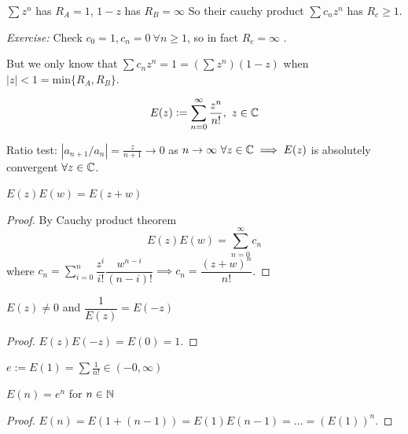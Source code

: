\documentclass[10pt,twoside]{scrartcl}
\begin{document}
\begin{example}
$\sum z^n$ has $R_A = 1$, $1-z$ has $R_B = \infty$ So their cauchy product $\sum c_nz^n$ has $R_c \geq 1$. 

\emph{Exercise:} Check $c_0 = 1, c_n = 0~\forall n \geq 1$, so in fact $R_c = \infty$	.

But we only know that $\sum c_n z^n = 1 = (\sum z^n)(1-z)$ when $|z| < 1 = \mathrm{min}\{R_A,R_B\}$. 
\end{example}

\vspace*{5pt}

\begin{definition}
\[E(z):= \sum_{n=0}^\infty \frac{z^n}{n!},~z\in\mathbb{C}\]

Ratio test: $|a_{n+1}/a_n| = \frac{z}{n+1} \to 0$ as $n \to \infty ~\forall z \in\mathbb{C}\implies E(z)$ is absolutely convergent $\forall z\in\mathbb{C}$.  
\end{definition}\vspace*{5pt}

\begin{proposition}
$E(z)E(w) = E(z + w)$
\end{proposition}
\begin{proof}
By Cauchy product theorem
\[E(z)E(w) = \sum_{n=0}^\infty c_n\]
where $c_n = \sum_{i=0}^n \dfrac{z^i}{i!}\dfrac{w^{n-i}}{(n-i)!} \implies c_n = \dfrac{(z+w)^n}{n!}$.
\end{proof}\vspace*{5pt}

\begin{corollary}
$E(z) \neq 0$ and $\dfrac{1}{E(z)} = E(-z)$
\end{corollary}
\begin{proof}
$E(z)E(-z) = E(0) = 1$.	
\end{proof}\vspace*{5pt}

\begin{definition}
$e:= E(1) = \sum \frac{1}{n!} \in (-0,\infty)$	
\end{definition}\vspace*{5pt}

\begin{corollary}
$E(n) = e^n$ for $n \in\mathbb{N}$	
\end{corollary}
\begin{proof}
	$E(n) = E(1 + (n-1)) = E(1)E(n-1) = \dots = (E(1))^n$.
\end{proof}\vspace*{5pt}
\end{document}
